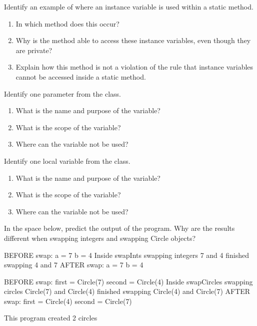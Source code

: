 \Q Identify an example of where an instance variable is used within a static method.
\begin{enumerate}
\item In which method does this occur?
\item Why is the method able to access these instance variables, even though they are private?
\item Explain how this method is not a violation of the rule that instance variables cannot be accessed inside a static method.
\end{enumerate}


\Q Identify one parameter from the  class.
\begin{enumerate}
\item What is the name and purpose of the variable?
\item What is the scope of the variable?
\item Where can the variable not be used?
\end{enumerate}


\Q Identify one local variable from the  class.
\begin{enumerate}
\item What is the name and purpose of the variable?
\item What is the scope of the variable?
\item Where can the variable not be used?
\end{enumerate}

\Q In the space below, predict the output of the  program. Why are the results different when swapping integers and swapping Circle objects?

\begin{answer}[20em]
\begin{javaans}
BEFORE swap:
a = 7  b = 4
    Inside swapInts
    swapping integers 7 and 4
    finished swapping 4 and 7
AFTER swap:
a = 7  b = 4

BEFORE swap:
first = Circle(7)  second = Circle(4)
    Inside swapCircles
    swapping circles Circle(7) and Circle(4)
    finished swapping Circle(4) and Circle(7)
AFTER swap:
first = Circle(4)  second = Circle(7)

This program created 2 circles
\end{javaans}
\end{answer}

\newpage

